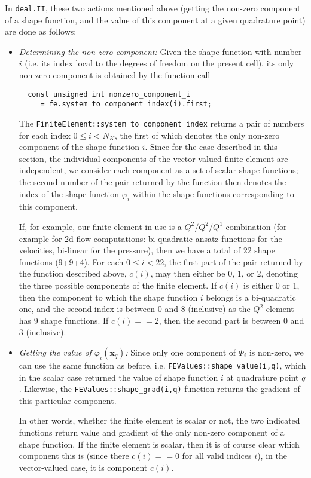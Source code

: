 \documentclass{article}
\renewcommand{\vec}[1]{{\mathbf #1}}
\begin{document}
In \texttt{deal.II}, these two actions mentioned above (getting the non-zero
component of a shape function, and the value of this component at a given
quadrature point) are done as follows:
\begin{itemize}
\item \textit{Determining the non-zero component:} Given the shape function
  with number $i$ (i.e. its index local to the degrees of freedom on the
  present cell), its only non-zero component is obtained by the function call 
\begin{verbatim}
  const unsigned int nonzero_component_i
     = fe.system_to_component_index(i).first;
\end{verbatim}
  The \texttt{FiniteElement::system\_to\_component\_index} returns a pair of
  numbers for each index $0\le i < N_K$, the first of which denotes the only
  non-zero component of the shape function $i$. Since for the case described
  in this section, the individual components of the vector-valued finite
  element are independent, we consider each component as a set of scalar shape
  functions; the second number of the pair returned by the function then
  denotes the index of the shape function $\varphi_i$ within the shape
  functions corresponding to this component.
  
  If, for example, our finite element in use is a $Q^2/Q^2/Q^1$ combination
  (for example for 2d flow computations: bi-quadratic ansatz functions for the
  velocities, bi-linear for the pressure), then we have a total of 22 shape
  functions (9+9+4). For each $0\le i < 22$, the first part of the pair
  returned by the function described above, $c(i)$, may then either be 0, 1,
  or 2, denoting the three possible components of the finite element. If
  $c(i)$ is either 0 or 1, then the component to which the shape function $i$
  belongs is a bi-quadratic one, and the second index is between $0$ and $8$
  (inclusive) as the $Q^2$ element has 9 shape functions. If $c(i)==2$, then
  the second part is between 0 and 3 (inclusive).

\item \textit{Getting the value of $\varphi_i(\vec x_q)$:} Since only one
  component of $\Phi_i$ is non-zero, we can use the same function as before,
  i.e. \texttt{FEValues::shape\_value(i,q)}, which in the scalar case returned
  the value of shape function $i$ at quadrature point $q$. Likewise, the 
  \texttt{FEValues::shape\_grad(i,q)} function returns the gradient of this
  particular component.

  In other words, whether the finite element is scalar or not, the two
  indicated functions return value and gradient of the only non-zero component
  of a shape function. If the finite element is scalar, then it is of course
  clear which component this is (since there $c(i)==0$ for all valid indices
  $i$), in the vector-valued case, it is component $c(i)$.
\end{itemize}
\end{document}
